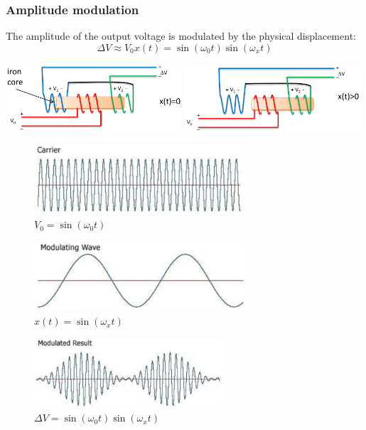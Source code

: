 \documentclass[11pt]{article}
\begin{document}
\subsubsection{Amplitude modulation}
\label{sec:org0e2913c}
The amplitude of the output voltage is modulated by the physical displacement:
\[\Delta V \approx V_0 x(t) = \sin (\omega_0 t) \sin (\omega_x t)\]

\begin{center}
\includegraphics[width=0.49\textwidth]{./images/amplitude-modulation-initial-state.png}
\includegraphics[width=0.49\textwidth]{./images/amplitude-modulation-modulated-state.png}
\end{center}

\begin{figure}[htbp]
\centering
\includegraphics[height=7em]{./images/amplitude-modulation-carrier-waveform.png}
\caption{\(V_0 = \sin (\omega_0 t)\)}
\end{figure}

\begin{figure}[htbp]
\centering
\includegraphics[height=7em]{./images/amplitude-modulation-modulating-wave.png}
\caption{\(x(t) = \sin (\omega_x t)\)}
\end{figure}

\begin{figure}[htbp]
\centering
\includegraphics[height=7em]{./images/amplitude-modulation-modulated-result.png}
\caption{\(\Delta V = \sin (\omega_0 t) \sin (\omega_x t)\)}
\end{figure}
\end{document}
